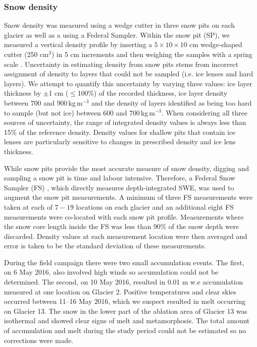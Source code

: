 \documentclass[twocolumn, letterpaper]{igs}
\begin{document}
\subsubsection{Snow density}

Snow density was measured using a wedge cutter in three snow pits on each glacier as well as a using a Federal Sampler. Within the snow pit (SP), we measured a vertical density profile by inserting a $5\times10\times 10$ cm wedge-shaped cutter (250 cm$^3$) in 5 cm increments and then weighing the samples with a spring scale \citep[e.g.][]{Gray1981,Fierz2009}. Uncertainty in estimating density from snow pits stems from incorrect assignment of density to layers that could not be sampled (i.e. ice lenses and hard layers). We attempt to quantify this uncertainty by varying three values: ice layer thickness by $\pm$1 cm ($\leq$100\%) of the recorded thickness, ice layer density between 700 and 900\,kg\,m$^{-3}$ and the density of layers identified as being too hard to sample (but not ice) between 600 and 700\,kg\,m$^{-3}$. When considering all three sources of uncertainty, the range of integrated density values is always less than 15\% of the reference density. Density values for shallow pits that contain ice lenses are particularly sensitive to changes in prescribed density and ice lens thickness. 

While snow pits provide the most accurate measure of snow density, digging and sampling a snow pit is time and labour intensive. Therefore, a Federal Snow Sampler (FS) \citep{Clyde1932}, which directly measures depth-integrated SWE, was used to augment the snow pit measurements. A minimum of three FS measurements were taken at each of $7-19$ locations on each glacier and an additional eight FS measurements were co-located with each snow pit profile. Measurements where the snow core length inside the FS was less than 90\% of the snow depth were discarded. Density values at each measurement location were then averaged and error is taken to be the standard deviation of these measurements.

During the field campaign there were two small accumulation events. The first, on 6 May 2016, also involved high winds so accumulation could not be determined. The second, on 10 May 2016, resulted in 0.01 m w.e accumulation measured at one location on Glacier 2. Positive temperatures and clear skies occurred between 11--16 May 2016, which we suspect resulted in melt occurring on Glacier 13. The snow in the lower part of the ablation area of Glacier 13 was isothermal and showed clear signs of melt and metamorphosis. The total amount of accumulation and melt during the study period could not be estimated so no corrections were made. 
\end{document}
